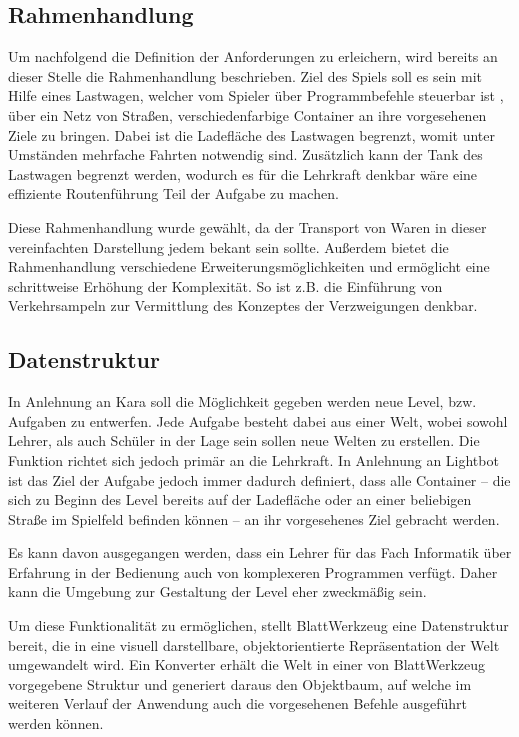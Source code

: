 \subsection{Rahmenhandlung}
\label{sec:requirements:world:background-story}

Um nachfolgend die Definition der Anforderungen zu erleichern, wird bereits an dieser Stelle die Rahmenhandlung beschrieben. Ziel des Spiels soll es sein mit Hilfe eines Lastwagen, welcher vom Spieler über Programmbefehle steuerbar ist , über ein Netz von Straßen, verschiedenfarbige Container an ihre vorgesehenen Ziele zu bringen. Dabei ist die Ladefläche des Lastwagen begrenzt, womit unter Umständen mehrfache Fahrten notwendig sind. Zusätzlich kann der Tank des Lastwagen begrenzt werden, wodurch es für die Lehrkraft denkbar wäre eine effiziente Routenführung Teil der Aufgabe zu machen.

Diese Rahmenhandlung wurde gewählt, da der Transport von Waren in dieser vereinfachten Darstellung jedem bekant sein sollte. Außerdem bietet die Rahmenhandlung verschiedene Erweiterungsmöglichkeiten und ermöglicht eine schrittweise Erhöhung der Komplexität. So ist z.B. die Einführung von Verkehrsampeln zur Vermittlung des Konzeptes der Verzweigungen denkbar.

\subsection{Datenstruktur}
\label{sec:requirements:world:structure}

In Anlehnung an Kara soll die Möglichkeit gegeben werden neue Level, bzw. Aufgaben zu entwerfen. Jede Aufgabe besteht dabei aus einer Welt, wobei sowohl Lehrer, als auch Schüler in der Lage sein sollen neue Welten zu erstellen. Die Funktion richtet sich jedoch primär an die Lehrkraft. In Anlehnung an Lightbot ist das Ziel der Aufgabe jedoch immer dadurch definiert, dass alle Container -- die sich zu Beginn des Level bereits auf der Ladefläche oder an einer beliebigen Straße im Spielfeld befinden können -- an ihr vorgesehenes Ziel gebracht werden.

Es kann davon ausgegangen werden, dass ein Lehrer für das Fach Informatik über Erfahrung in der Bedienung auch von komplexeren Programmen verfügt. Daher kann die Umgebung zur Gestaltung der Level eher zweckmäßig sein.

Um diese Funktionalität zu ermöglichen, stellt BlattWerkzeug eine Datenstruktur bereit, die in eine visuell darstellbare, objektorientierte Repräsentation der Welt umgewandelt wird. Ein Konverter erhält die Welt in einer von BlattWerkzeug vorgegebene Struktur und generiert daraus den Objektbaum, auf welche im weiteren Verlauf der Anwendung auch die vorgesehenen Befehle  ausgeführt werden können.

